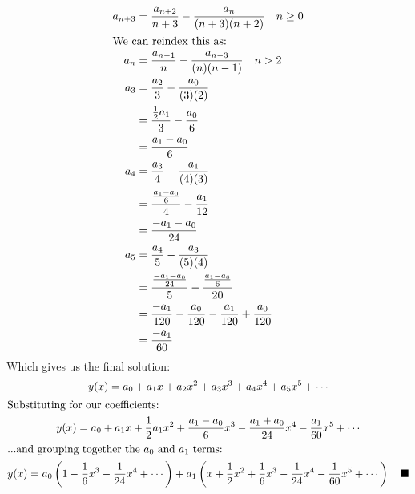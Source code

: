 \documentclass[letterpaper, fontsize=11pt]{scrartcl} %
\numberwithin{equation}{section} %
\numberwithin{figure}{section} %
\numberwithin{table}{section} %
\begin{document}
\begin{enumerate}
\begin{enumerate}
\begin{align*}
a_{n+3} &= \frac{a_{n+2}}{n+3} - \frac{a_n}{(n+3)(n+2)}\quad n \geq 0\\
\intertext{We can reindex this as:}
a_{n} &= \frac{a_{n-1}}{n} - \frac{a_{n-3}}{(n)(n-1)}\quad n > 2\\
a_{3} &= \frac{a_{2}}{3} - \frac{a_{0}}{(3)(2)}\\
&= \frac{\frac{1}{2}a_1}{3} - \frac{a_0}{6}\\
&= \frac{a_1 - a_0}{6}\\
a_{4} &= \frac{a_{3}}{4} - \frac{a_{1}}{(4)(3)}\\
&= \frac{ \frac{a_1 - a_0}{6}}{4} - \frac{a_{1}}{12} \\
&= \frac{-a_1 - a_0}{24} \\
a_{5} &= \frac{a_{4}}{5} - \frac{a_{3}}{(5)(4)}\\
 &= \frac{\frac{-a_1 - a_0}{24} }{5} - \frac{\frac{a_1 - a_0}{6} }{20}\\
 &= \frac{-a_1}{120} - \frac{a_0}{120} - \frac{a_1}{120} + \frac{a_0}{120}\\
 &= \frac{-a_1}{60}
\end{align*}
Which gives us the final solution:
\begin{gather*}
y(x) = a_0 + a_1x + a_2x^2 + a_3x^3 + a_4 x^4 + a_5 x^5 + \cdots\\
\intertext{Substituting for our coefficients:}
y(x) = a_0 + a_1x + \frac{1}{2}a_1x^2 + \frac{a_1 - a_0}{6}x^3 - \frac{a_1 + a_0}{24} x^4 - \frac{a_1}{60} x^5 + \cdots\\
\intertext{...and grouping together the $a_0$ and $a_1$ terms:}
y(x) = a_0\left(1 - \frac{1}{6}x^3 - \frac{1}{24}x^4 + \cdots \right) + a_1 \left( x + \frac{1}{2}x^2 + \frac{1}{6}x^3 - \frac{1}{24}x^4 - \frac{1}{60}x^5 + \cdots\right)\quad\blacksquare
\end{gather*}



\end{enumerate}
\end{enumerate}
\end{document}
